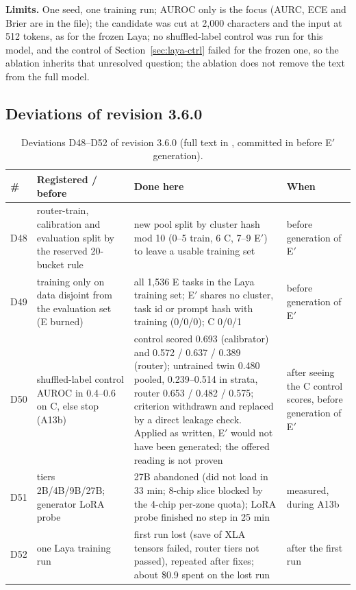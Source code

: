 \documentclass[11pt,a4paper]{article}
\newcommand{\code}[1]{\texttt{\detokenize{#1}}}
\begin{document}
\textbf{Limits.} One seed, one training run; AUROC only is the focus (AURC, ECE and Brier are in the file); the candidate was cut at 2,000 characters and the input at 512 tokens, as for the frozen Laya; no shuffled-label control was run for this model, and the control of Section~\ref{sec:laya-ctrl} failed for the frozen one, so the ablation inherits that unresolved question; the ablation does not remove the text from the full model.

\subsection{Deviations of revision 3.6.0}

\begin{table}[!htbp]\centering\scriptsize\setlength{\tabcolsep}{4pt}
\caption{Deviations D48--D52 of revision 3.6.0 (full text in \code{docs/DEVIATIONS.md}, committed in \code{d217f1e} before E$'$ generation).}
\label{tab:dev36}
\begin{tabular}{l p{4.2cm} p{6.6cm} p{2.0cm}}\toprule
\# & Registered / before & Done here & When\\\midrule
D48 & router-train, calibration and evaluation split by the reserved 20-bucket rule & new pool split by cluster hash mod 10 (0--5 train, 6 C, 7--9 E$'$) to leave a usable training set & before generation of E$'$\\
D49 & training only on data disjoint from the evaluation set (E burned) & all 1,536 E tasks in the Laya training set; E$'$ shares no cluster, task id or prompt hash with training (0/0/0); C 0/0/1 & before generation of E$'$\\
D50 & shuffled-label control AUROC in 0.4--0.6 on C, else stop (A13b) & control scored 0.693 (calibrator) and 0.572 / 0.637 / 0.389 (router); untrained twin 0.480 pooled, 0.239--0.514 in strata, router 0.653 / 0.482 / 0.575; criterion withdrawn and replaced by a direct leakage check. Applied as written, E$'$ would not have been generated; the offered reading is not proven & after seeing the C control scores, before generation of E$'$\\
D51 & tiers 2B/4B/9B/27B; generator LoRA probe & 27B abandoned (did not load in 33 min; 8-chip slice blocked by the 4-chip per-zone quota); LoRA probe finished no step in 25 min & measured, during A13b\\
D52 & one Laya training run & first run lost (save of XLA tensors failed, router tiers not passed), repeated after fixes; about \$0.9 spent on the lost run & after the first run\\
\bottomrule\end{tabular}\end{table}
\end{document}
